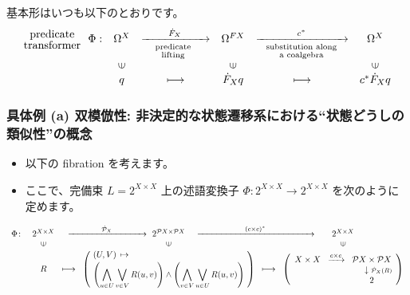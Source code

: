 \documentclass[
		head_space=20mm,
		foot_space=20mm,
		gutter=10mm,
		line_length=190mm
]{jlreq}
\begin{document}
\begin{screen}
\noindent 基本形はいつも以下のとおりです。
\[\begin{array}{cccccc}
	\substack{\displaystyle\textrm{predicate}\\\displaystyle\textrm{transformer}}~~\Phi:& \Omega^{X} & \xrightarrow[~~~\substack{\textrm{predicate}\\ \textrm{lifting}}~~~~]{\dot F_X} & \Omega^{FX} & \xrightarrow[~~\substack{\textrm{substitution along}\\\textrm{a coalgebra}}~~]{c^\ast} & \Omega^{X} \\
	& \rotatebox{90}{$\in$} && \rotatebox{90}{$\in$} &&\rotatebox{90}{$\in$}\\
	& q & \longmapsto & \dot F_X q & \longmapsto & c^\ast\dot F_X q
\end{array}\]
\end{screen}

\subsubsection*{具体例 (a) 双模倣性: 非決定的な状態遷移系における``状態どうしの類似性''の概念}


\begin{itemize}
	\item 以下の fibration を考えます。
	\begin{center}
		
	\end{center}
	\item ここで、完備束 $L=2^{X\times X}$ 上の述語変換子 $\Phi:2^{X\times X}\to 2^{X\times X}$ を次のように定めます。
\end{itemize}
\[
\begin{array}{cccccc}
\Phi\colon &
2^{X\times X} &
\hspace*{-65pt} \xrightarrow{~~~~~~~~~~~ \dot{\mathcal P}_X ~~~~~~~~~~~} \hspace*{-155pt} &
2^{\mathcal P X\times\mathcal P X} & 
\hspace*{-175pt} \xrightarrow{~~~~~~~~~~~~~~~~ (c\times c)^* ~~~~~~~~~~~~~~~~} \hspace*{-145pt} &
2^{X\times X} \\
& \rotatebox{90}{$\in$} & & \rotatebox{90}{$\in$} & & \rotatebox{90}{$\in$} \\
& R & \!\longmapsto\! & \left(\!\begin{array}{l}(U,V)\,\mapsto\\[2pt]\displaystyle\left(\bigwedge_{u\in U}\bigvee_{v\in V} R(u,v)\right)\land\displaystyle\left(\bigwedge_{v\in V}\bigvee_{u\in U} R(u,v)\right)\end{array}\!\right) & \!\longmapsto\! & \left(\begin{array}{ccc}
	X\times X & \!\xrightarrow{c\times c}\! & \mathcal PX\times\mathcal PX \\
	&& ~~~\downarrow\substack{\dot{\mathcal P}_X(R)}\!\!\! \\
	& & 2
\end{array}\right)
\end{array}
\]%
\end{document}
